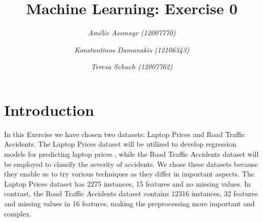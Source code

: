 \documentclass{article}
\title{\textbf{Machine Learning: Exercise 0}}
\author{\textit{Amélie Assmayr (12007770)} \and
        \textit{Konstantinos Damanakis (12106343)} \and
        \textit{Teresa Schuch (12007762)}}
\date{}
\begin{document}
\maketitle
\vspace{-45pt}

\section{Introduction}
\vspace{-8pt}
In this Exercise we have chosen two datasets: Laptop Prices and Road Traffic Accidents. The Laptop Prices dataset will be utilized to develop regression models for predicting laptop prices , while the Road Traffic Accidents dataset will be employed to classify the severity of accidents. We chose these datasets because they enable us to try various techniques as they differ in important aspects. The Laptop Prices dataset has 2275 instances, 15 features and no missing values. In contrast, the Road Traffic Accidents dataset contains 12316 instances, 32 features and missing values in 16 features, making the preprocessing more important and complex.

\vspace{-8pt}
\end{document}
